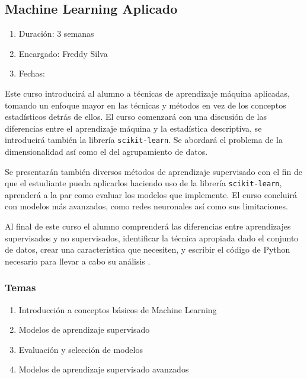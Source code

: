 \documentclass{article}
\begin{document}
        \subsection{Machine Learning Aplicado}

            \begin{enumerate}
                \item Duración: 3 semanas
                \item Encargado: Freddy Silva
                \item Fechas:
            \end{enumerate}

            Este curso introducirá al alumno a técnicas de aprendizaje máquina aplicadas, tomando un enfoque mayor en las técnicas y métodos en vez de los conceptos estadísticos detrás de ellos. El curso comenzará con una discusión de las diferencias entre el aprendizaje máquina y la estadística descriptiva, se introducirá también la librería \texttt{scikit-learn}. Se abordará el problema de la dimensionalidad así como el del agrupamiento de datos.

            Se presentarán también diversos métodos de aprendizaje supervisado con el fin de que el estudiante pueda aplicarlos haciendo uso de la librería \texttt{scikit-learn}, aprenderá a la par como evaluar los modelos que implemente. El curso concluirá con modelos más avanzados, como redes neuronales así como sus limitaciones.

            Al final de este curso el alumno comprenderá las diferencias entre aprendizajes supervisados y no supervisados, identificar la técnica apropiada dado el conjunto de datos, crear una característica que necesiten, y escribir el código de Python necesario para llevar a cabo su análisis \cite{applied-ml}.

            \subsubsection{Temas}

                \begin{enumerate}
                    \item Introducción a conceptos básicos de Machine Learning
                    \item Modelos de aprendizaje supervisado
                    \item Evaluación y selección de modelos
                    \item Modelos de aprendizaje supervisado avanzados
                \end{enumerate}
\end{document}
